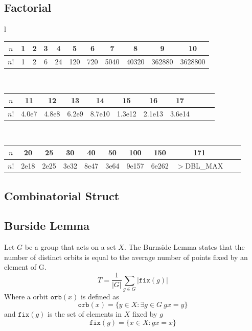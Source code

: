 	\subsection{Factorial}

		\begin{center}
			\begin{tabular}{l}
				\begin{tabular}{c|c@{\ }c@{\ }c@{\ }c@{\ }c@{\ }c@{\ }c@{\ }c@{\ }c@{\ }c}
				$n$  & 1 & 2 & 3 & 4  & 5   & 6   & 7    & 8     & 9      & 10\\
				\hline
				$n!$ & 1 & 2 & 6 & 24 & 120 & 720 & 5040 & 40320 & 362880 & 3628800\\
				\end{tabular}\\
				\begin{tabular}{c|c@{\ }c@{\ }c@{\ }c@{\ }c@{\ }c@{\ }c@{\ }c@{\ }c@{\ }c}
				$n$  & 11    & 12    & 13    & 14     & 15     & 16     & 17\\
				\hline
				$n!$ & 4.0e7 & 4.8e8 & 6.2e9 & 8.7e10 & 1.3e12 & 2.1e13 & 3.6e14\\
				\end{tabular}\\
				\begin{tabular}{c|c@{\ }c@{\ }c@{\ }c@{\ }c@{\ }c@{\ }c@{\ }c@{\ }c@{\ }c}
				$n$  & 20   & 25   & 30   & 40   & 50   & 100   & 150   & 171\\
				\hline
				$n!$ & 2e18 & 2e25 & 3e32 & 8e47 & 3e64 & 9e157 & 6e262 & \scriptsize{$>$DBL\_MAX}\\
				\end{tabular}
			\end{tabular}
		\end{center}

	\subsection{Combinatorial Struct}


	\subsection{Burside Lemma}

	Let $G$ be a group that acts on a set $X$. The Burnside Lemma states that the number of distinct orbits is equal to the average number of points fixed by an element of G.
    $$T = \frac{1}{|G|} \sum_{g \in G} |\texttt{fix}(g)|$$
    Where a orbit $\texttt{orb}(x)$ is defined as
    $$\texttt{orb}(x) = \{y \in X : \exists g \in G \ gx = y \}$$
    and $\texttt{fix}(g)$ is the set of elements in $X$ fixed by $g$
    $$\texttt{fix}(g) = \{x \in X : gx = x\}$$
    

